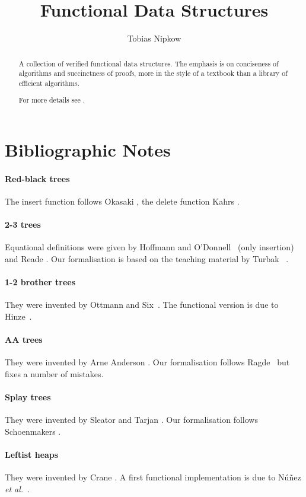 \documentclass[11pt,a4paper]{article}
\begin{document}
\title{Functional Data Structures}
\author{Tobias Nipkow}
\maketitle

\begin{abstract}
A collection of verified functional data structures. The emphasis is on
conciseness of algorithms and succinctness of proofs, more in the style
of a textbook than a library of efficient algorithms.

For more details see \cite{Nipkow16}.
\end{abstract}

\setcounter{tocdepth}{1}
\tableofcontents
\newpage



\section{Bibliographic Notes}

\paragraph{Red-black trees}
The insert function follows Okasaki \cite{Okasaki}, the delete function
Kahrs \cite{Kahrs-html,Kahrs-JFP01}.

\paragraph{2-3 trees}
Equational definitions were given by Hoffmann and
O'Donnell~\cite{HoffmannOD-TOPLAS82} (only insertion)
and Reade \cite{Reade-SCP92}.
Our formalisation is based on the teaching material by
Turbak~\cite{Turbak230} .

\paragraph{1-2 brother trees}
They were invented by Ottmann and Six~\cite{OttmannS76,OttmannW-CJ80}.
The functional version is due to Hinze~\cite{Hinze-bro12}.

\paragraph{AA trees}
They were invented by Arne Anderson \cite{Andersson-WADS93}.
Our formalisation follows Ragde~\cite{Ragde14} but fixes a number
of mistakes.

\paragraph{Splay trees}
They were invented by Sleator and Tarjan \cite{SleatorT-JACM85}.
Our formalisation follows Schoenmakers \cite{Schoenmakers-IPL93}.

\paragraph{Leftist heaps}
They were invented by Crane \cite{Crane72}. A first functional implementation
is due to N\'u\~{n}ez \emph{et al.}~\cite{NunezPP95}.



\end{document}

